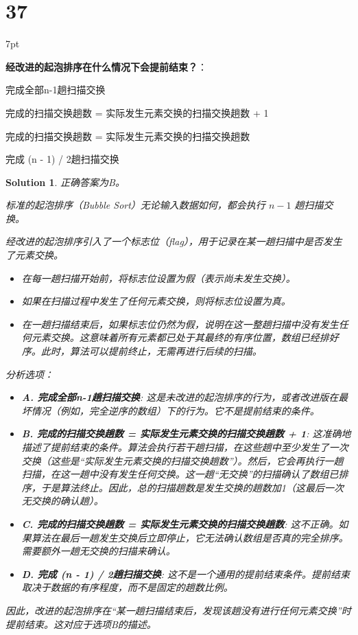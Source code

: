 \documentclass[UTF8]{report}
\newtheorem{solution}{Solution}
\theoremstyle{MyLineTheoremStyle} %
\theoremstyle{MyBlockTheoremStyle} %
\theoremstyle{MySubsubsectionStyle} %
\newenvironment{graybox}{%
        \def\FrameCommand{%
        \hspace{1pt}%
        {\color{gray}\small \vrule width 2pt}%
        {\color{graybox_color}\vrule width 4pt}%
        \colorbox{graybox_color}%
        }%
        \MakeFramed{\advance\hsize-\width\FrameRestore}%
        \noindent\hspace{-4.55pt}%
        \begin{adjustwidth}{}{7pt}%
        \vspace{2pt}\vspace{2pt}%
        }
        {%
        \vspace{2pt}\end{adjustwidth}\endMakeFramed%
        }
\begin{document}
\section*{37}

\begin{graybox}
\textbf{经改进的起泡排序在什么情况下会提前结束？}：
\begin{circledenum}
    \item 完成全部n-1趟扫描交换
    \item 完成的扫描交换趟数 = 实际发生元素交换的扫描交换趟数 + 1
    \item 完成的扫描交换趟数 = 实际发生元素交换的扫描交换趟数
    \item 完成 (n - 1) / 2趟扫描交换
\end{circledenum}
\end{graybox}

\begin{solution}
正确答案为B。

标准的起泡排序（Bubble Sort）无论输入数据如何，都会执行 $n-1$ 趟扫描交换。

经改进的起泡排序引入了一个标志位（flag），用于记录在某一趟扫描中是否发生了元素交换。
\begin{itemize}
    \item 在每一趟扫描开始前，将标志位设置为假（表示尚未发生交换）。
    \item 如果在扫描过程中发生了任何元素交换，则将标志位设置为真。
    \item 在一趟扫描结束后，如果标志位仍然为假，说明在这一整趟扫描中没有发生任何元素交换。这意味着所有元素都已处于其最终的有序位置，数组已经排好序。此时，算法可以提前终止，无需再进行后续的扫描。
\end{itemize}

分析选项：
\begin{itemize}
    \item \textbf{A. 完成全部n-1趟扫描交换}: 这是未改进的起泡排序的行为，或者改进版在最坏情况（例如，完全逆序的数组）下的行为。它不是提前结束的条件。

    \item \textbf{B. 完成的扫描交换趟数 = 实际发生元素交换的扫描交换趟数 + 1}:
    这准确地描述了提前结束的条件。算法会执行若干趟扫描，在这些趟中至少发生了一次交换（这些是“实际发生元素交换的扫描交换趟数”）。然后，它会再执行一趟扫描，在这一趟中没有发生任何交换。这一趟“无交换”的扫描确认了数组已排序，于是算法终止。因此，总的扫描趟数是发生交换的趟数加1（这最后一次无交换的确认趟）。

    \item \textbf{C. 完成的扫描交换趟数 = 实际发生元素交换的扫描交换趟数}:
    这不正确。如果算法在最后一趟发生交换后立即停止，它无法确认数组是否真的完全排序。需要额外一趟无交换的扫描来确认。

    \item \textbf{D. 完成 (n - 1) / 2趟扫描交换}:
    这不是一个通用的提前结束条件。提前结束取决于数据的有序程度，而不是固定的趟数比例。
\end{itemize}
因此，改进的起泡排序在“某一趟扫描结束后，发现该趟没有进行任何元素交换”时提前结束。这对应于选项B的描述。
\end{solution}
\end{document}
